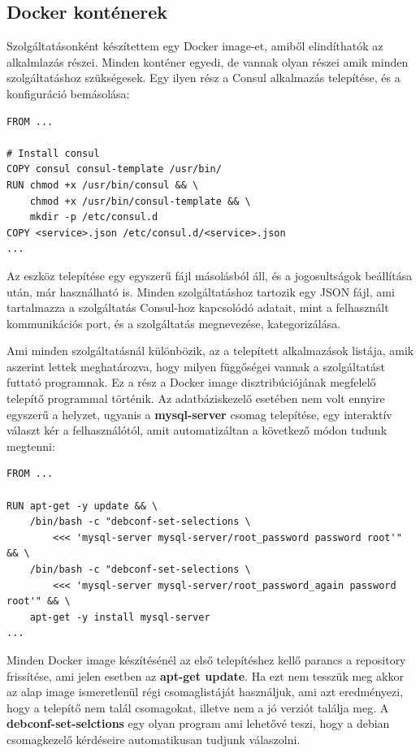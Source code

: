 \documentclass[11pt,magyar,a4paper,twoside,]{report}
\begin{document}
\subsection{Docker konténerek}\label{docker-kontuxe9nerek}

Szolgáltatásonként készítettem egy Docker image-et, amiből elindíthatók
az alkalmlazás részei. Minden konténer egyedi, de vannak olyan részei
amik minden szolgáltatáshoz szükségesek. Egy ilyen rész a Consul
alkalmazás telepítése, és a konfiguráció bemásolása:

\begin{verbatim}
FROM ...

# Install consul
COPY consul consul-template /usr/bin/
RUN chmod +x /usr/bin/consul && \
    chmod +x /usr/bin/consul-template && \
    mkdir -p /etc/consul.d
COPY <service>.json /etc/consul.d/<service>.json
...
\end{verbatim}

Az eszköz telepítése egy egyszerű fájl másolásból áll, és a
jogosultságok beállítása után, már használható is. Minden
szolgáltatáshoz tartozik egy JSON fájl, ami tartalmazza a szolgáltatás
Consul-hoz kapcsolódó adatait, mint a felhasznált kommunikációs port, és
a szolgáltatás megnevezése, kategorizálása.

Ami minden szolgáltatásnál különbözik, az a telepített alkalmazások
listája, amik aszerint lettek meghatározva, hogy milyen függőségei
vannak a szolgáltatást futtató programnak. Ez a rész a Docker image
disztribúciójának megfelelő telepítő programmal történik. Az
adatbáziskezelő esetében nem volt ennyire egyszerű a helyzet, ugyanis a
\textbf{mysql-server} csomag telepítése, egy interaktív választ kér a
felhasználótól, amit automatizáltan a következő módon tudunk megtenni:

\begin{verbatim}
FROM ...

RUN apt-get -y update && \
    /bin/bash -c "debconf-set-selections \
        <<< 'mysql-server mysql-server/root_password password root'" && \
    /bin/bash -c "debconf-set-selections \
        <<< 'mysql-server mysql-server/root_password_again password root'" && \
    apt-get -y install mysql-server
...
\end{verbatim}

Minden Docker image készítésénél az első telepítéshez kellő parancs a
repository frissítése, ami jelen esetben az \textbf{apt-get update}. Ha
ezt nem tesszük meg akkor az alap image ismeretlenül régi csomaglistáját
használjuk, ami azt eredményezi, hogy a telepítő nem talál csomagokat,
illetve nem a jó verziót találja meg. A \textbf{debconf-set-selctions}
egy olyan program ami lehetővé teszi, hogy a debian csomagkezelő
kérdéseire automatikusan tudjunk válaszolni.
\end{document}
